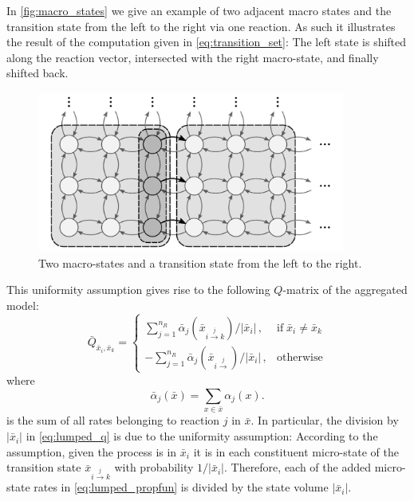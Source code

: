 \begin{example}
In \autoref{fig:macro_states}
we give an example of two adjacent macro states and the
transition state from the left to the right via one reaction.
As such it illustrates the result of the computation given in \eqref{eq:transition_set}:
The left state is shifted along the reaction vector, intersected with the right macro-state, and finally shifted back.
\begin{figure}[htb]
	\centering
	\includegraphics[width=0.9\textwidth]{gfx/macro_states.pdf}
	\caption[Macro-state transition]{\label{fig:macro_states}Two macro-states and a transition state from the left to the right.}
\end{figure}
\end{example}

This uniformity assumption gives rise to the following $Q$-matrix of the aggregated model:
\begin{equation}\label{eq:lumped_q}
    \bar{Q}_{ \bar{x}_i,  \bar{x}_k} = \begin{cases}
        \sum_{j=1}^{n_R}{\bar\alpha}_j\left(\bar{x}_{i\xrightarrow{j}k}\right)/\left|\bar{x}_i\right|\,,&\text{if}\; \bar{x}_i\neq \bar{x}_k\\[1ex]
        -\sum_{j=1}^{n_R}{\bar\alpha}_j\left(\bar{x}_{i\xrightarrow{j}}\right)/{\left|\bar{x}_i\right|}\,, &\text{otherwise}
    \end{cases}
\end{equation}
where 
\begin{equation}\label{eq:lumped_propfun}
    \bar{\alpha}_j({\bar{x}}) = \sum_{x\in \bar{x}} \alpha_j(x).
\end{equation}
is the sum of all rates belonging to reaction $j$ in $\bar{x}$.
In particular, the division by $\left|\bar{x}_i\right|$ in \eqref{eq:lumped_q} is due to the uniformity assumption: According to the assumption, given the process is in $\bar{x}_i$ it is in
each constituent micro-state of the transition state $\bar{x}_{i\xrightarrow{j} k}$ with probability $1/{\left|\bar{x}_i\right|}$.
Therefore, each of the added micro-state rates in \eqref{eq:lumped_propfun} is divided
by the state volume $\left|\bar{x}_i\right|$.


